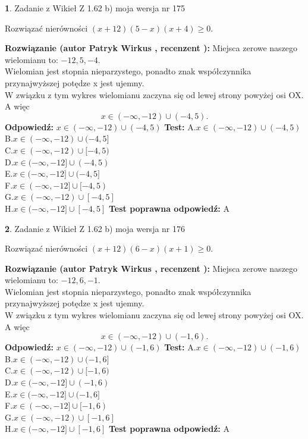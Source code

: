 \documentclass[12pt, a4paper]{article}
\theoremstyle{definition} %
\newtheorem{zad}{}
\newcommand{\zadStart}[1]{\begin{zad}#1\newline}
\newcommand{\zadStop}{\end{zad}}
\newcommand{\rozwStart}[2]{\noindent \textbf{Rozwiązanie (autor #1 , recenzent #2): }\newline}
\newcommand{\rozwStop}{\newline}
\newcommand{\odpStart}{\noindent \textbf{Odpowiedź:}\newline}
\newcommand{\odpStop}{\newline}
\newcommand{\testStart}{\noindent \textbf{Test:}\newline}
\newcommand{\testStop}{\newline}
\newcommand{\kluczStart}{\noindent \textbf{Test poprawna odpowiedź:}\newline}
\newcommand{\kluczStop}{\newline}
\begin{document}
\zadStart{Zadanie z Wikieł Z 1.62 b) moja wersja nr 175}

Rozwiązać nierówności $(x+12)(5-x)(x+4)\ge0$.
\zadStop
\rozwStart{Patryk Wirkus}{}
Miejsca zerowe naszego wielomianu to: $-12, 5, -4$.\\
Wielomian jest stopnia nieparzystego, ponadto znak współczynnika przy\linebreak najwyższej potędze x jest ujemny.\\ W związku z tym wykres wielomianu zaczyna się od lewej strony powyżej osi OX. A więc $$x \in (-\infty,-12) \cup (-4,5).$$
\rozwStop
\odpStart
$x \in (-\infty,-12) \cup (-4,5)$
\odpStop
\testStart
A.$x \in (-\infty,-12) \cup (-4,5)$\\
B.$x \in (-\infty,-12) \cup (-4,5]$\\
C.$x \in (-\infty,-12) \cup [-4,5)$\\
D.$x \in (-\infty,-12] \cup (-4,5)$\\
E.$x \in (-\infty,-12] \cup (-4,5]$\\
F.$x \in (-\infty,-12] \cup [-4,5)$\\
G.$x \in (-\infty,-12) \cup [-4,5]$\\
H.$x \in (-\infty,-12] \cup [-4,5]$
\testStop
\kluczStart
A
\kluczStop



\zadStart{Zadanie z Wikieł Z 1.62 b) moja wersja nr 176}

Rozwiązać nierówności $(x+12)(6-x)(x+1)\ge0$.
\zadStop
\rozwStart{Patryk Wirkus}{}
Miejsca zerowe naszego wielomianu to: $-12, 6, -1$.\\
Wielomian jest stopnia nieparzystego, ponadto znak współczynnika przy\linebreak najwyższej potędze x jest ujemny.\\ W związku z tym wykres wielomianu zaczyna się od lewej strony powyżej osi OX. A więc $$x \in (-\infty,-12) \cup (-1,6).$$
\rozwStop
\odpStart
$x \in (-\infty,-12) \cup (-1,6)$
\odpStop
\testStart
A.$x \in (-\infty,-12) \cup (-1,6)$\\
B.$x \in (-\infty,-12) \cup (-1,6]$\\
C.$x \in (-\infty,-12) \cup [-1,6)$\\
D.$x \in (-\infty,-12] \cup (-1,6)$\\
E.$x \in (-\infty,-12] \cup (-1,6]$\\
F.$x \in (-\infty,-12] \cup [-1,6)$\\
G.$x \in (-\infty,-12) \cup [-1,6]$\\
H.$x \in (-\infty,-12] \cup [-1,6]$
\testStop
\kluczStart
A
\kluczStop
\end{document}
